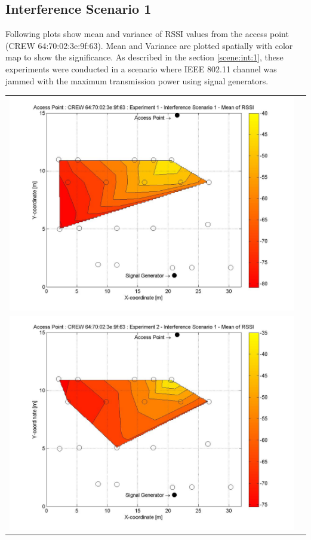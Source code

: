 \documentclass[11pt,a4paper,headinclude,footinclude,chapterprefix=on]{scrreprt}
\begin{document}
\subsection{Interference Scenario 1} 
Following plots show mean and variance of RSSI values from the access point (CREW 64:70:02:3e:9f:63). Mean and Variance are plotted spatially with color map to show the significance. As described in the section \ref{scene:int:1}, these experiments were conducted in a scenario where IEEE 802.11 channel was jammed with the maximum transmission power using signal generators.
\begin{longtable}
	{lr} 
	\includegraphics[width=13cm]{../../Source/plot/CREW_63/63_Sig_Ex_1_Mean.jpg} \\
	\includegraphics[width=13cm]{../../Source/plot/CREW_63/63_Sig_Ex_2_Mean.jpg} \\

\end{longtable}
\end{document}

